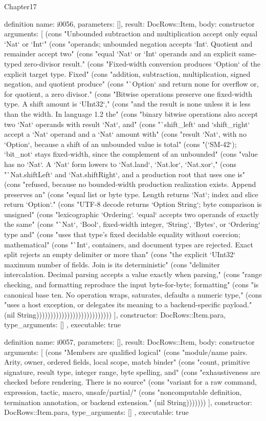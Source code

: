\begin{lexlean}{Chapter17}
\begin{semanticmodule}
definition{
  name: i0056,
  parameters: [],
  result: DocRows::Item,
  body: constructor{
    arguments: [
      (cons "Unbounded subtraction and multiplication accept only equal `Nat` or `Int`" (cons "operands; unbounded negation accepts `Int`. Quotient and remainder accept two" (cons "equal `Nat` or `Int` operands and an explicit same-typed zero-divisor result." (cons "Fixed-width conversion produces `Option` of the explicit target type. Fixed" (cons "addition, subtraction, multiplication, signed negation, and quotient produce" (cons "`Option` and return none for overflow or, for quotient, a zero divisor." (cons "Bitwise operations preserve one fixed-width type. A shift amount is `UInt32`," (cons "and the result is none unless it is less than the width. In language 1.2 the" (cons "binary bitwise operations also accept two `Nat` operands with result `Nat`, and" (cons "`shift_left` and `shift_right` accept a `Nat` operand and a `Nat` amount with" (cons "result `Nat`, with no `Option`, because a shift of an unbounded value is total" (cons "(`SM-42`); `bit_not` stays fixed-width, since the complement of an unbounded" (cons "value has no `Nat`. A `Nat` form lowers to `Nat.land`, `Nat.lor`, `Nat.xor`," (cons "`Nat.shiftLeft` and `Nat.shiftRight`, and a production root that uses one is" (cons "refused, because no bounded-width production realization exists. Append preserves an" (cons "equal list or byte type. Length returns `Nat`; index and slice return `Option`." (cons "UTF-8 decode returns `Option String`; byte comparison is unsigned" (cons "lexicographic `Ordering`. `equal` accepts two operands of exactly the same" (cons "`Nat`, `Bool`, fixed-width integer, `String`, `Bytes`, or `Ordering` type and" (cons "uses that type's fixed decidable equality without coercion; mathematical" (cons "`Int`, containers, and document types are rejected. Exact split rejects an empty delimiter or more than" (cons "the explicit `UInt32` maximum number of fields. Join is its deterministic" (cons "delimiter intercalation. Decimal parsing accepts a value exactly when parsing," (cons "range checking, and formatting reproduce the input byte-for-byte; formatting" (cons "is canonical base ten. No operation wraps, saturates, defaults a numeric type," (cons "uses a host exception, or delegates its meaning to a backend-specific payload." (nil String)))))))))))))))))))))))))))
    ],
    constructor: DocRows::Item.para,
    type_arguments: []
  },
  executable: true
}

definition{
  name: i0057,
  parameters: [],
  result: DocRows::Item,
  body: constructor{
    arguments: [
      (cons "Members are qualified logical" (cons "module/name pairs. Arity, owner, ordered fields, local scope, match binder" (cons "count, primitive signature, result type, integer range, byte spelling, and" (cons "exhaustiveness are checked before rendering. There is no source" (cons "variant for a raw command, expression, tactic, macro, unsafe/partial/" (cons "noncomputable definition, termination annotation, or backend extension." (nil String)))))))
    ],
    constructor: DocRows::Item.para,
    type_arguments: []
  },
  executable: true
}


\end{semanticmodule}
\end{lexlean}
